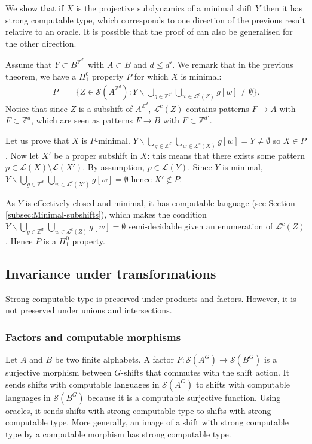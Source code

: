 \documentclass[french,american]{article}
\theoremstyle{plain}
\theoremstyle{definition}
\theoremstyle{remark}
\theoremstyle{plain}
\begin{document}
We show that if $X$ is the projective subdynamics of a minimal shift $Y$ then it has strong computable type, which corresponds to one direction of the previous result relative to an oracle. It is possible that the proof of \cite{jeandel2019characterization} can also be generalised for the other direction.

Assume that $Y\subset B^{\mathbb Z^{d'}}$ with $A\subset B$ and $d\leq d'$. We remark that in the previous theorem, we have a $\Pi_{1}^{0}$ property $P$ for which $X$ is minimal:
\begin{align*}
P & =\{Z\in\mathcal{S}(A^{\mathbb{Z}^{d}}):Y\backslash\bigcup_{g\in\mathbb{Z}^{d'}}\bigcup_{w\in\mathcal{L}^{c}(Z)}g[w]\neq\emptyset\}.
\end{align*}
Notice that since $Z$ is a subshift of $A^{\mathbb{Z}^{d}}$, $\mathcal{L}^{c}(Z)$ contains patterns $F\to A$ with $F\subset \mathbb Z^d$, which are seen as patterns $F\to B$ with $F\subset \mathbb Z^{d'}$.

Let us prove that $X$ is $P$-minimal. $Y\backslash\bigcup_{g\in\mathbb{Z}^{d'}}\bigcup_{w\in\mathcal{L}^{c}(X)}g[w]=Y\neq\emptyset$
so $X\in P$. Now let $X'$ be a proper subshift in $X$: this means
that there exists some pattern $p\in \mathcal L(X)\setminus \mathcal L(X')$. By assumption, $p\in\mathcal L(Y)$. Since $Y$ is minimal, $Y\backslash\bigcup_{g\in\mathbb{Z}^{d'}}\bigcup_{w\in\mathcal{L}^{c}(X')}g[w]=\emptyset$
hence $X'\notin P$.

As $Y$ is effectively closed and minimal, it has computable language
(see Section \ref{subsec:Minimal-subshifts}), which makes the condition
$Y\backslash\bigcup_{g\in\mathbb{Z}^{d'}}\bigcup_{w\in\mathcal{L}^{c}(Z)}g[w]=\emptyset$ semi-decidable
given an enumeration of $\mathcal{L}^{c}(Z)$. Hence $P$ is a $\Pi_{1}^{0}$ property.


\subsection{Invariance under transformations}

Strong computable type is preserved under products and factors. However,
it is not preserved under unions and intersections.

\subsubsection{Factors and computable morphisms}

Let $A$ and $B$ be two finite alphabets. A factor $F:\mathcal{S}(A^{G})\rightarrow\mathcal{S}(B^{G})$
is a surjective morphism between $G$-shifts that commutes with the
shift action. It sends shifts with computable languages in $\mathcal{S}(A^{G})$
to shifts with computable languages in $\mathcal{S}(B^{G})$ because
it is a computable surjective function. Using oracles, it sends shifts
with strong computable type to shifts with strong computable type.
More generally, an image of a shift with strong computable type by
a computable morphism has strong computable type.
\end{document}
